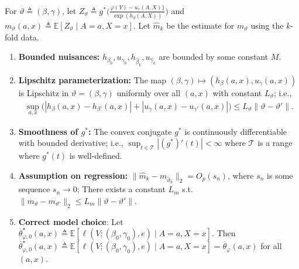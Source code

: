 \begin{assumption}\label{assumption:regularity-condition-2}
    \normalfont
    For $\vartheta \triangleq (\beta, \gamma)$, let $Z_{\vartheta} \triangleq g^{\ast}\big( \tfrac{\varphi(Y) - u_{\gamma}(A,X)\}}{ \exp(h_\beta(A,X))}\big)$ and $m_{\vartheta}(a,x) \triangleq \mathbb{E}[Z_{\vartheta} \mid A=a,X=x]$. Let $\widehat{m}_k$ be the estimate for $m_{\vartheta}$ using the $k$-fold data.
    \begin{enumerate}[leftmargin=*]
        \item \textbf{Bounded nuisances:} $h_{\beta_0}, u_{\gamma_0}, h_{\hat{\beta}_k}, u_{\hat{\gamma}_k}$ are bounded by some constant $M$. 
        \item \textbf{Lipschitz parameterization:} The map $(\beta,\gamma) \mapsto (h_{\beta}(a,x), u_{\gamma}(a,x)) $ is Lipschitz in $\vartheta = (\beta,\gamma)$ uniformly over all $(a,x)$ with constant $L_{\vartheta}$; i.e., 
        \begin{align}
            \sup_{a,x}\big(|h_{\beta}(a,x)-h_{\beta'}(a,x)| + |u_{\gamma}(a,x)-u_{\gamma'}(a,x)| \big) \le L_\vartheta\|\vartheta-\vartheta'\|.
        \end{align}
        \item \textbf{Smoothness of $g^{\ast}$:} The convex conjugate $g^{\ast}$ is continuously differentiable with bounded derivative; i.e., $\sup_{t \in \mathcal{T}}|(g^{\ast})'(t)| < \infty$ where $\mathcal{T}$ is a range where $g^{\ast}(t)$ is well-defined. 
        \item \textbf{Assumption on regression:} $\|\widehat m_k - m_{\widehat\vartheta_k}\|_2 = O_p(s_n)$, where  $s_n$ is some sequence $s_n \rightarrow 0$; There exists a constant $L_m$ s.t. $\|m_{\vartheta} - m_{\vartheta'}\|_2 \leq L_m\|\vartheta-\vartheta'\|$. 
        \item \textbf{Correct model choice}: Let $\overline{\theta}^{\star}_{\varphi,0}(a,x) \triangleq \mathbb{E}[\ell(V; (\beta_0,\gamma_0),e) \mid A=a,X=x]$. Then $\overline{\theta}^{\star}_{\varphi,0}(a,x) \triangleq \mathbb{E}[\ell(V; (\beta_0,\gamma_0),e) \mid A=a,X=x] = \overline{\theta}_{\varphi}(a,x)$ for all $(a,x)$. 
    \end{enumerate}
\end{assumption}

